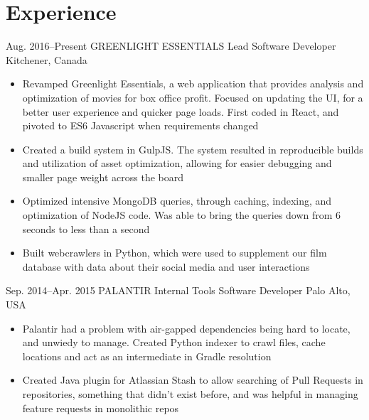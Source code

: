 \documentclass{resume-class}
\begin{document}


\section{Experience}

\begin{sectionlist}
	\entry
	{    Aug. 2016--Present}
	{GREENLIGHT ESSENTIALS}
	{Lead Software Developer}
	{Kitchener, Canada}
	{
		\begin{itemize}
		    \setlength{\itemsep}{0.2em}
			\item Revamped Greenlight Essentials, a web application that provides analysis and optimization of movies for box office profit. Focused on updating the UI, for a better user experience and quicker page loads. First coded in React, and pivoted to ES6 Javascript when requirements changed
			\item Created a build system in GulpJS. The system resulted in reproducible builds and utilization of asset optimization, allowing for easier debugging and smaller page weight across the board
			\item Optimized intensive MongoDB queries, through caching, indexing, and optimization of NodeJS code. Was able to bring the queries down from 6 seconds to less than a second
			\item Built webcrawlers in Python, which were used to supplement our film database with data about their social media and user interactions
		\end{itemize}
	}
	
	\entry
	{Sep. 2014--Apr. 2015}
	{PALANTIR}
	{Internal Tools Software Developer}
	{Palo Alto, USA} 
	{
		\begin{itemize}
		    \setlength{\itemsep}{0.2em}
			\item Palantir had a problem with air-gapped dependencies being hard to locate, and unwiedy to manage. Created Python indexer to crawl files, cache locations and act as an intermediate in Gradle resolution
			\item Created Java plugin for Atlassian Stash to allow searching of Pull Requests in repositories, something that didn't exist before, and was helpful in managing feature requests in monolithic repos
		\end{itemize}
	}
	

\end{sectionlist}
\end{document}
